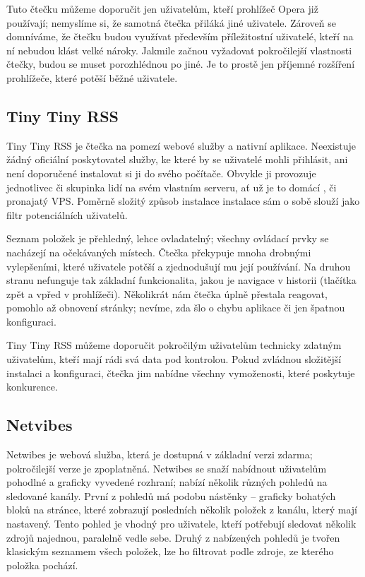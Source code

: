 Tuto čtečku můžeme doporučit jen uživatelům, kteří prohlížeč Opera již používají; nemyslíme si, že samotná čtečka přiláká jiné uživatele.
Zároveň se domníváme, že čtečku budou využívat především příležitostní uživatelé, kteří na ní nebudou klást velké nároky.
Jakmile začnou vyžadovat pokročilejší vlastnosti čtečky, budou se muset porozhlédnou po jiné.
Je to prostě jen příjemné rozšíření prohlížeče, které potěší běžné uživatele.

\subsection{Tiny Tiny RSS}

Tiny Tiny RSS je čtečka na pomezí webové služby a nativní aplikace.
Neexistuje žádný oficiální poskytovatel služby, ke které by se uživatelé mohli přihlásit, ani není doporučené instalovat si ji do svého počítače.
Obvykle ji provozuje jednotlivec či skupinka lidí na svém vlastním serveru, ať už je to domácí , či pronajatý VPS.
Poměrně složitý způsob instalace instalace sám o sobě slouží jako filtr potenciálních uživatelů.

Seznam položek je přehledný, lehce ovladatelný; všechny ovládací prvky se nacházejí na očekávaných místech.
Čtečka překypuje mnoha drobnými vylepšeními, které uživatele potěší a zjednodušují mu její používání.
Na druhou stranu nefunguje tak základní funkcionalita, jakou je navigace v historii (tlačítka zpět a vpřed v prohlížeči).
Několikrát nám čtečka úplně přestala reagovat, pomohlo až obnovení stránky; nevíme, zda šlo o chybu aplikace či jen špatnou konfiguraci.

Tiny Tiny RSS můžeme doporučit pokročilým uživatelům technicky zdatným uživatelům, kteří mají rádi svá data pod kontrolou.
Pokud zvládnou složitější instalaci a konfiguraci, čtečka jim nabídne všechny vymoženosti, které poskytuje konkurence.

\subsection{Netvibes}

Netwibes je webová služba, která je dostupná v základní verzi zdarma; pokročilejší verze je zpoplatněná.
Netwibes se snaží nabídnout uživatelům pohodlné a graficky vyvedené rozhraní; nabízí několik různých pohledů na sledované kanály.
První z pohledů má podobu nástěnky -- graficky bohatých bloků na stránce, které zobrazují posledních několik položek z kanálu, který mají nastavený.
Tento pohled je vhodný pro uživatele, kteří potřebují sledovat několik zdrojů najednou, paralelně vedle sebe.
Druhý z nabízených pohledů je tvořen klasickým seznamem všech položek, lze ho filtrovat podle zdroje, ze kterého položka pochází.

